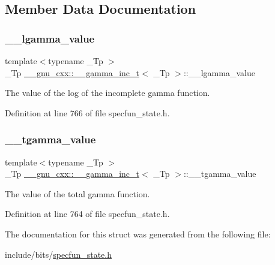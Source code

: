 \subsection{Member Data Documentation}
\mbox{\label{struct____gnu__cxx_1_1____gamma__inc__t_a193b3f7871e371363571fe90b1ce1767}} 
\subsubsection{\texorpdfstring{\+\_\+\+\_\+lgamma\+\_\+value}{\_\_lgamma\_value}}
{\footnotesize\ttfamily template$<$typename \+\_\+\+Tp $>$ \\
\+\_\+\+Tp \hyperlink{struct____gnu__cxx_1_1____gamma__inc__t}{\+\_\+\+\_\+gnu\+\_\+cxx\+::\+\_\+\+\_\+gamma\+\_\+inc\+\_\+t}$<$ \+\_\+\+Tp $>$\+::\+\_\+\+\_\+lgamma\+\_\+value}



The value of the log of the incomplete gamma function. 



Definition at line 766 of file specfun\+\_\+state.\+h.

\mbox{\label{struct____gnu__cxx_1_1____gamma__inc__t_a53d4ffc984c6685ce328caff424b5fe4}} 
\subsubsection{\texorpdfstring{\+\_\+\+\_\+tgamma\+\_\+value}{\_\_tgamma\_value}}
{\footnotesize\ttfamily template$<$typename \+\_\+\+Tp $>$ \\
\+\_\+\+Tp \hyperlink{struct____gnu__cxx_1_1____gamma__inc__t}{\+\_\+\+\_\+gnu\+\_\+cxx\+::\+\_\+\+\_\+gamma\+\_\+inc\+\_\+t}$<$ \+\_\+\+Tp $>$\+::\+\_\+\+\_\+tgamma\+\_\+value}



The value of the total gamma function. 



Definition at line 764 of file specfun\+\_\+state.\+h.



The documentation for this struct was generated from the following file\+:\begin{DoxyCompactItemize}
\item 
include/bits/\hyperlink{specfun__state_8h}{specfun\+\_\+state.\+h}\end{DoxyCompactItemize}
